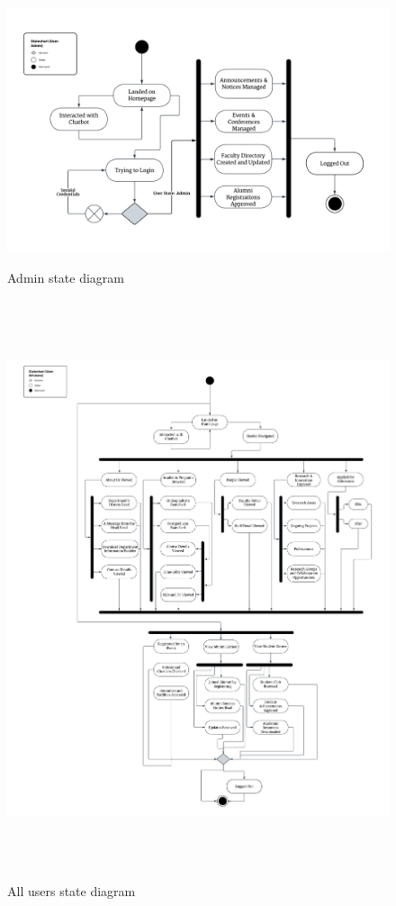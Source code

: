 \documentclass[11pt]{article}
\begin{document}
\begin{customItemize}
\begin{figure}[H]
    \end{figure}
    \FloatBarrier
    \FloatBarrier
    \begin{figure}[H]
        \centering
        \includegraphics[height=8cm]{StateChart - Admin.png}
        \caption{Admin state diagram}
        \label{Admin state diagram}
    \end{figure}
    \FloatBarrier
    \FloatBarrier
    \begin{figure}[H]
        \centering
        \includegraphics[height=17cm]{StateChart - All users.png}
        \caption{All users state diagram}
        \label{All users state diagram}
    \end{figure}
    \FloatBarrier
\end{customItemize}
\end{document}
